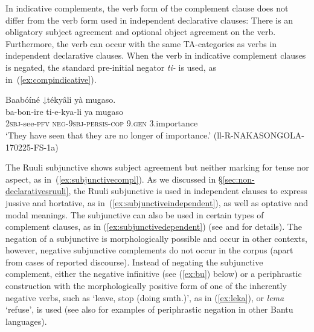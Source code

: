 \documentclass[output=paper,colorlinks,citecolor=brown,draftmode]{langscibook}
\begin{document}
In indicative complements, the verb form of the complement clause does not differ from the verb form used in independent declarative clauses: 
There is an obligatory subject agreement and optional object agreement on the verb. 
Furthermore, the verb can occur with the same TA-categories as verbs in  independent declarative clauses. 
When the verb in indicative complement clauses is negated, the standard pre-initial negator \textit{ti-} is used, as in~(\ref{ex:compindicative}).

\ea \label{ex:compindicative} \label{ex:ruulietal:23}
	\glll   Baabóíné ↓tékyâli yà mugaso.\\
	        ba-bon-ire ti-e-kya-li ya mugaso\\
		    2\textsc{sbj}-see-\textsc{pfv} \textsc{neg}-9\textsc{sbj}-\textsc{persis}-\textsc{cop} 9.\textsc{gen} 3.importance\\
    \glt ‘They have seen that they are no longer of importance.’ (ll-R-NAKASONGOLA-170225-FS-1a)
\z

The Ruuli subjunctive shows subject agreement but neither marking for tense nor aspect, as in~(\ref{ex:subjunctivecompl}). 
As we discussed in §\ref{sec:non-declarativesruuli}, the Ruuli subjunctive is used in independent clauses to express jussive and hortative, as in~(\ref{ex:subjunctiveindependent}), as well as optative and modal meanings. 
The subjunctive can also be used in certain types of complement clauses, as in (\ref{ex:subjunctivedependent}) (see \citealt{SorensenWitzlack-Makarevich2020} and \citealt{VeselovskyEtAl2023} for details).
The negation of a subjunctive is morphologically possible and occur in other contexts, however, negative subjunctive complements do not occur in the corpus (apart from cases of reported discourse). 
Instead of negating the subjunctive complement, either the negative infinitive (see (\ref{ex:bu}) below) or a periphrastic construction with the morphologically positive form of one of the inherently negative verbs, such as  ‘leave, stop (doing smth.)’, as in (\ref{ex:leka}), or \textit{lema} ‘refuse', is used (see also \citet{Güldemann1999} for examples of periphrastic negation in other Bantu languages). 
 
\end{document}
